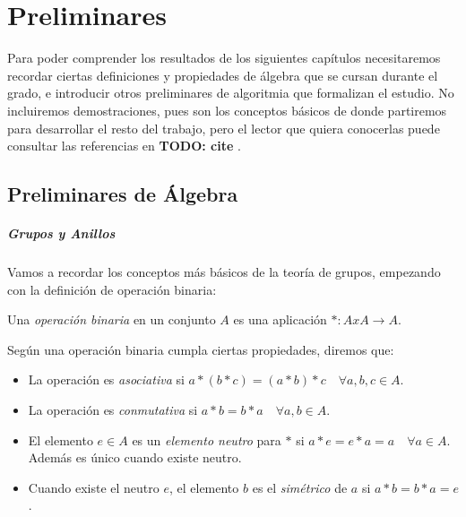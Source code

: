 \chapter{Preliminares}\label{ch:preliminares}


Para poder comprender los resultados de los siguientes capítulos necesitaremos recordar ciertas definiciones y propiedades de álgebra que se cursan durante el grado, e introducir otros preliminares de algoritmia que formalizan el estudio. No incluiremos demostraciones, pues son los conceptos básicos de donde partiremos para desarrollar el resto del trabajo, pero el lector que quiera conocerlas puede consultar las referencias en \textbf{TODO: cite} \citep{gruposYanillos}.


\section{Preliminares de Álgebra}



\paragraph{Grupos y Anillos}

\hfil

Vamos a recordar los conceptos más básicos de la teoría de grupos, empezando con la definición de operación binaria:

\begin{definition}
	Una \textit{operación binaria} en un conjunto $A$ es una aplicación $* : AxA \rightarrow A$.
\end{definition}

Según una operación binaria cumpla ciertas propiedades, diremos que:

\begin{itemize}
	\item La operación es \textit{asociativa} si $a*(b*c) = (a*b)*c \quad \forall a,b,c\in A$.
	\item La operación es \textit{conmutativa} si $a*b=b*a\quad \forall a,b\in A$.
	\item El elemento $e\in A$ es un \textit{elemento neutro} para $*$ si $a*e = e*a = a \quad \forall a\in A$. Además es único cuando existe neutro.
	\item Cuando existe el neutro $e$, el elemento $b$ es el \textit{simétrico} de $a$ si $a*b=b*a=e$.
\end{itemize}

